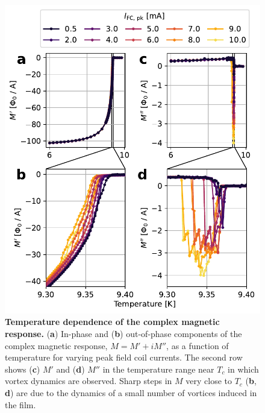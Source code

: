 \documentclass[%
 reprint,
 superscriptaddress,
 amsmath,
 amssymb,
 amsfonts,
 aps,
 prb,
]{revtex4-2}
\newcommand{\Tc}{T_c}
\begin{document}
\begin{figure}
    \centering
    \includegraphics[width=\linewidth]{figures/susc-vs-temp-1col.pdf}
    \caption{{\bf Temperature dependence of the complex magnetic response.} ({\bf a}) In-phase and ({\bf b}) out-of-phase components of the complex magnetic response, $M=M'+iM''$, as a function of temperature for varying peak field coil currents. The second row shows ({\bf c}) $M'$ and ({\bf d}) $M''$ in the temperature range near $\Tc$ in which vortex dynamics are observed. Sharp steps in $M$ very close to $T_c$ ({\bf b}, {\bf d}) are due to the dynamics of a small number of vortices induced in the film.}
    \label{fig:M-vs-T}
\end{figure}
\end{document}
